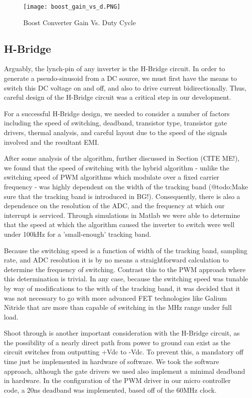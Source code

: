 \begin{figure}
\centering
\texttt{[image: boost\_gain\_vs\_d.PNG]}
\caption{Boost Converter Gain Vs. Duty Cycle}
\label{Boost Converter Gain Vs. Duty Cycle}
\end{figure}



\subsection{H-Bridge}
Arguably, the lynch-pin of any inverter is the H-Bridge circuit. In order to generate a pseudo-sinusoid from a DC source, we must first have the means to switch this DC voltage on and off, and also to drive current bidirectionally. Thus, careful design of the H-Bridge circuit was a critical step in our development.

For a successful H-Bridge design, we needed to consider a number of factors including the speed of switching, deadband, transistor type, transistor gate drivers, thermal analysis, and careful layout due to the speed of the signals involved and the resultant EMI.

After some analysis of the algorithm, further discussed in Section (CITE ME!), we found that the speed of switching with the hybrid algorithm - unlike the switching speed of PWM algorithms which modulate over a fixed carrier frequency - was highly dependent on the width of the tracking band (@todo:Make sure that the tracking band is introduced in BG!). Consequently, there is also a dependence on the resolution of the ADC, and the frequency at which our interrupt is serviced. Through simulations in Matlab we were able to determine that the speed at which the algorithm caused the inverter to switch were well under 100kHz for a 'small-enough' tracking band. 

Because the switching speed is a function of width of the tracking band, sampling rate, and ADC resolution it is by no means a straightforward calculation to determine the frequency of switching. Contrast this to the PWM approach where this determination is trivial. In any case, because the switching speed was tunable by way of modifications to the with of the tracking band, it was decided that it was not necessary to go with more advanced FET technologies like Galium Nitride that are more than capable of switching in the MHz range under full load. 

Shoot through is another important consideration with the H-Bridge circuit, as the possibility of a nearly direct path from power to ground can exist as the circuit switches from outputting +Vdc to -Vdc. To prevent this, a mandatory off time just be implemented in hardware of software. We took the software approach, although the gate drivers we used also implement a minimal deadband in hardware. In the configuration of the PWM driver in our micro controller code, a 20ns deadband was implemented, based off of the 60MHz clock.


